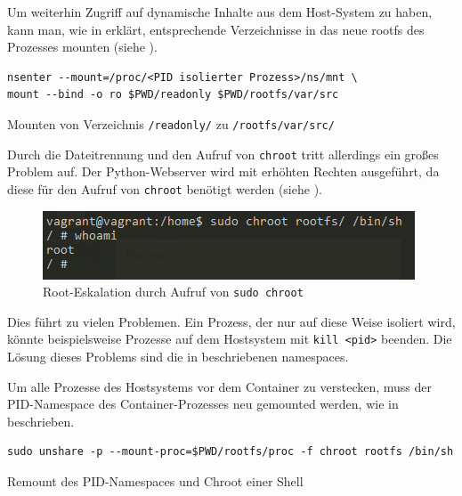 Um weiterhin Zugriff auf dynamische Inhalte aus dem Host-System zu haben, kann man, wie in  erklärt, entsprechende Verzeichnisse in das neue rootfs des Prozesses mounten (siehe ).

\begin{listing}[h]
	\begin{verbatim}
nsenter --mount=/proc/<PID isolierter Prozess>/ns/mnt \
mount --bind -o ro $PWD/readonly $PWD/rootfs/var/src
	\end{verbatim}
	\caption{Mounten von Verzeichnis \texttt{/readonly/} zu \texttt{/rootfs/var/src/}}
	\label{lst:mountReadOnly}
\end{listing}

Durch die Dateitrennung und den Aufruf von \texttt{chroot} tritt allerdings ein großes Problem auf. Der Python-Webserver wird mit erhöhten Rechten ausgeführt, da diese für den Aufruf von \texttt{chroot} benötigt werden (siehe ).

\begin{figure}[h]
	\begin{center}
		\includegraphics[scale=1]{bilder/chroot-whoami-root.png}
		\caption{Root-Eskalation durch Aufruf von \texttt{sudo chroot}}
		\label{fig:chrootWhoami}
	\end{center}
\end{figure}

Dies führt zu vielen Problemen. Ein Prozess, der nur auf diese Weise isoliert wird, könnte beispielsweise Prozesse auf dem Hostsystem mit \texttt{kill <pid>} beenden. Die Lösung dieses Problems sind die in  beschriebenen namespaces.

Um alle Prozesse des Hostsystems vor dem Container zu verstecken, muss der PID-Namespace des Container-Prozesses neu gemounted werden, wie in  beschrieben.
\begin{listing}[h]
	\begin{verbatim}
sudo unshare -p --mount-proc=$PWD/rootfs/proc -f chroot rootfs /bin/sh
	\end{verbatim}
	\caption{Remount des PID-Namespaces und Chroot einer Shell}
	\label{lst:unshareRemount}
\end{listing}

